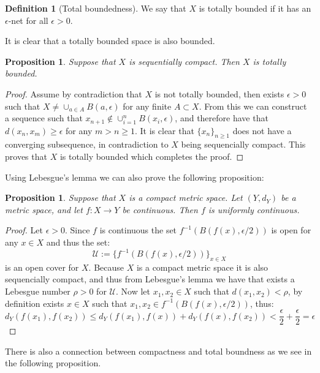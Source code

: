 \documentclass[11pt,a4paper]{article}
\theoremstyle{definition}
\newtheorem{definition}{Definition}[section]
\theoremstyle{plain}
\newtheorem{proposition}[theorem]{Proposition}
\begin{document}
  \begin{definition}[Total boundedness]
    We say that $X$ is totally bounded if it has an $\epsilon$-net 
    for all $\epsilon > 0$.
  \end{definition}

  It is clear that a totally bounded space is also bounded. 

  \begin{proposition}
    Suppose that $X$ is sequentially compact. Then $X$ is totally bounded.
  \end{proposition}
  \begin{proof}
    Assume by contradiction that $X$ is not totally bounded, then exists
    $\epsilon > 0$ such that $X \neq \cup_{a \in A} B(a,\epsilon)$ for any
    finite $A \subset X$. From this we can construct a sequence such that
    $x_{n+1} \notin \cup_{i=1}^{n} B(x_i,\epsilon)$, and therefore have
    that $d(x_n,x_m) \geq \epsilon$ for any $m > n \geq 1$. It is clear
    that $\{x_n\}_{n \geq 1}$ does not have a converging subsequence,
    in contradiction to $X$ being sequencially compact. This proves that
    $X$ is totally bounded which completes the proof.
  \end{proof}

  Using Lebesgue's lemma we can also prove the following proposition:
  
  \begin{proposition}
    Suppose that $X$ is a compact metric space. Let $(Y, d_Y)$ be a 
    metric space, and let $f \colon X \to Y$ be continuous. Then $f$ is 
    uniformly continuous.	
  \end{proposition}
  \begin{proof}
    Let $\epsilon > 0$. Since $f$ is continuous the set 
    $f^{-1}(B(f(x),\epsilon/2))$ is open for any $x \in X$ and thus
    the set:
    \[
      \mathcal{U} := \{f^{-1}(B(f(x),\epsilon/2))\}_{x \in X}
    \]
    is an open cover for $X$. Because $X$ is a compact metric space
    it is also sequencially compact, and thus from Lebesgue's lemma
    we have that exists a Lebesgue number $\rho > 0$ for $\mathcal{U}$.
    Now let $x_1,x_2 \in X$ such that $d(x_1,x_2) < \rho$, by definition
    exists $x \in X$ such that $x_1,x_2 \in f^{-1}(B(f(x),\epsilon/2))$,
    thus:
    \[
      d_Y(f(x_1),f(x_2)) \le d_Y(f(x_1),f(x)) + d_Y(f(x),f(x_2)) <
      \frac{\epsilon}{2} + \frac{\epsilon}{2} = \epsilon
    \]
  \end{proof}

  There is also a connection between compactness and total boundness as
  we see in the following proposition.
  
\end{document}
